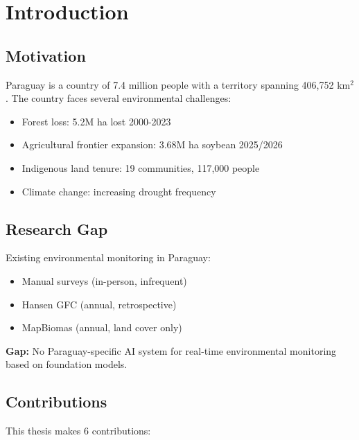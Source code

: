 \documentclass[12pt,a4paper,oneside]{book}
\begin{document}
\tableofcontents

\mainmatter

\chapter{Introduction}
\label{ch:intro}

\section{Motivation}

Paraguay is a country of 7.4 million people with a territory spanning 406,752 km$^2$. The country faces several environmental challenges:

\begin{itemize}
\item Forest loss: 5.2M ha lost 2000-2023
\item Agricultural frontier expansion: 3.68M ha soybean 2025/2026
\item Indigenous land tenure: 19 communities, 117,000 people
\item Climate change: increasing drought frequency
\end{itemize}

\section{Research Gap}

Existing environmental monitoring in Paraguay:

\begin{itemize}
\item Manual surveys (in-person, infrequent)
\item Hansen GFC (annual, retrospective)
\item MapBiomas (annual, land cover only)
\end{itemize}

\textbf{Gap:} No Paraguay-specific AI system for real-time environmental monitoring based on foundation models.

\section{Contributions}

This thesis makes 6 contributions:
\end{document}
